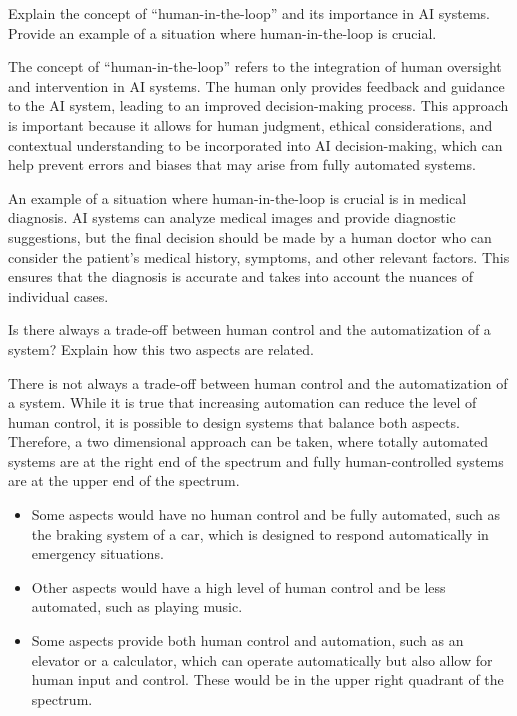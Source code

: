 \begin{ejercicio}
    Explain the concept of ``human-in-the-loop'' and its importance in AI systems. Provide an example of a situation where human-in-the-loop is crucial.

    The concept of ``human-in-the-loop'' refers to the integration of human oversight and intervention in AI systems. The human only provides feedback and guidance to the AI system, leading to an improved decision-making process. This approach is important because it allows for human judgment, ethical considerations, and contextual understanding to be incorporated into AI decision-making, which can help prevent errors and biases that may arise from fully automated systems.

    An example of a situation where human-in-the-loop is crucial is in medical diagnosis. AI systems can analyze medical images and provide diagnostic suggestions, but the final decision should be made by a human doctor who can consider the patient's medical history, symptoms, and other relevant factors. This ensures that the diagnosis is accurate and takes into account the nuances of individual cases.
\end{ejercicio}

\begin{ejercicio}
    Is there always a trade-off between human control and the automatization of a system? Explain how this two aspects are related.

    There is not always a trade-off between human control and the automatization of a system. While it is true that increasing automation can reduce the level of human control, it is possible to design systems that balance both aspects. Therefore, a two dimensional approach can be taken, where totally automated systems are at the right end of the spectrum and fully human-controlled systems are at the upper end of the spectrum.
    \begin{itemize}
        \item Some aspects would have no human control and be fully automated, such as the braking system of a car, which is designed to respond automatically in emergency situations.
        \item Other aspects would have a high level of human control and be less automated, such as playing music.
        \item Some aspects provide both human control and automation, such as an elevator or a calculator, which can operate automatically but also allow for human input and control. These would be in the upper right quadrant of the spectrum.
    \end{itemize}
\end{ejercicio}

